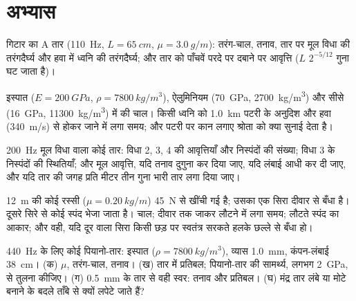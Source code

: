 \section{अभ्यास}

\begin{exercise}[$\star$]\label{exo:b2:waves-on-strings:1}
गिटार का A तार (\qty{110}{Hz}, $L = \qty{65}{cm}$, $\mu = \qty{3.0}{g/m}$):
तरंग-चाल, तनाव, तार पर मूल विधा की तरंगदैर्घ्य और हवा में ध्वनि की
तरंगदैर्घ्य; और तार को पाँचवें परदे पर दबाने पर आवृत्ति
($L$ $2^{-5/12}$ गुना घट जाता है)।
\end{exercise}

\begin{exercise}[$\star$]\label{exo:b2:waves-on-strings:2}
इस्पात ($E = \qty{200}{GPa}$, $\rho =
\qty{7800}{kg/m^3}$), ऐलुमिनियम (\qty{70}{GPa}, \qty{2700}{kg/m^3}) और सीसे
(\qty{16}{GPa}, \qty{11300}{kg/m^3}) में  की चाल। किसी ध्वनि को \qty{1.0}{km}
पटरी के अनुदिश और हवा (\qty{340}{m/s}) से होकर जाने में लगा समय; और
पटरी पर कान लगाए श्रोता को क्या सुनाई देता है।
\end{exercise}

\begin{exercise}[$\star$]\label{exo:b2:waves-on-strings:3}
\qty{200}{Hz} मूल विधा वाला कोई तार: विधा 2, 3, 4 की आवृत्तियाँ और
निस्पंदों की संख्या; विधा 3 के निस्पंदों की स्थितियाँ; और मूल आवृत्ति,
यदि तनाव दुगुना कर दिया जाए, यदि लंबाई आधी कर दी जाए, और यदि
तार की जगह प्रति मीटर तीन गुना भारी तार लगा दिया जाए।
\end{exercise}

\begin{exercise}[$\star$]\label{exo:b2:waves-on-strings:4}
\qty{12}{m} की कोई रस्सी ($\mu = \qty{0.20}{kg/m}$) \qty{45}{N} से खींची गई है; उसका एक
सिरा दीवार से बँधा है। दूसरे सिरे से कोई स्पंद भेजा जाता है। चाल;
दीवार तक जाकर लौटने में लगा समय; लौटते स्पंद का आकार;
और वही, यदि दूर वाला सिरा किसी छड़ पर स्वतंत्र सरकते हलके छल्ले से
बँधा हो।
\end{exercise}

\begin{exercise}[$\star\star$]\label{exo:b2:waves-on-strings:5}
\qty{440}{Hz} के लिए कोई पियानो-तार: इस्पात ($\rho = \qty{7800}{kg/m^3}$),
व्यास \qty{1.0}{mm}, कंपन-लंबाई \qty{38}{cm}। (क) $\mu$, तरंग-चाल,
तनाव। (ख) तार में प्रतिबल; पियानो-तार की सामर्थ्य, लगभग
\qty{2}{GPa}, से तुलना कीजिए। (ग) \qty{0.5}{mm} के तार से वही स्वर: तनाव
और प्रतिबल। (घ) मंद्र तार लंबे या मोटे बनाने के बदले ताँबे से
क्यों लपेटे जाते हैं?
\end{exercise}

